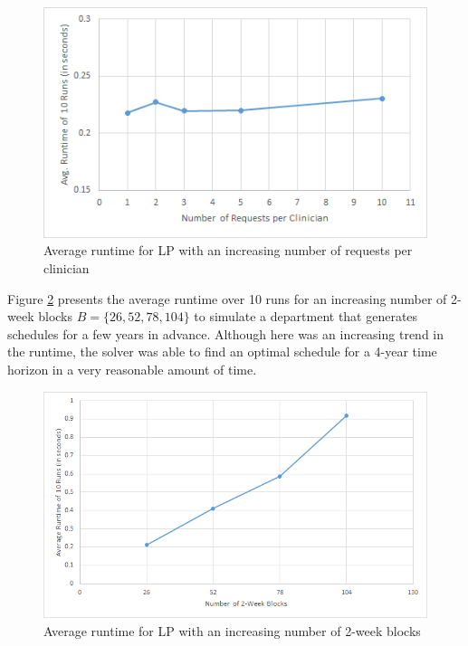 \begin{figure}[h]
	\centering
	\includegraphics[scale=.7]{fig/avg_runtime_requests}
	\caption{Average runtime for LP with an increasing number of requests per clinician}
	\label{fig:avg-runtime-requests}
\end{figure}

Figure \ref{fig:avg-runtime-blocks} presents the average runtime over 10 runs for an increasing number of 2-week blocks $B = \{26, 52, 78, 104\}$ to simulate a department that generates schedules for a few years in advance. Although here was an increasing trend in the runtime, the solver was able to find an optimal schedule for a 4-year time horizon in a very reasonable amount of time. \\ %

\begin{figure}[h]
	\centering
	\includegraphics[scale=.7]{fig/avg_runtime_blocks}
	\caption{Average runtime for LP with an increasing number of 2-week blocks}
	\label{fig:avg-runtime-blocks}
\end{figure}

